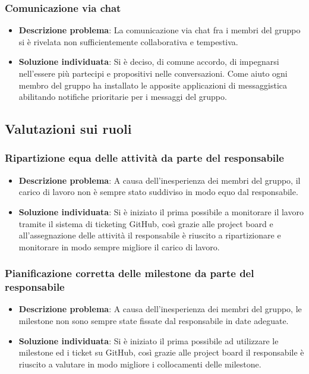 		\subsubsection{Comunicazione via chat}
			\begin{itemize}
			\item \textbf{Descrizione problema}: La comunicazione via chat fra i membri del gruppo si è rivelata non sufficientemente collaborativa e tempestiva.
			\item \textbf{Soluzione individuata}: Si è deciso, di comune accordo, di impegnarsi nell'essere più partecipi e propositivi nelle conversazioni. Come aiuto ogni membro del gruppo ha installato le apposite applicazioni di messaggistica abilitando notifiche prioritarie per i messaggi del gruppo.
			\end{itemize}
\subsection{Valutazioni sui ruoli}
	\subsubsection{Ripartizione equa delle attività da parte del responsabile}
	\begin{itemize}
		\item \textbf{Descrizione problema}: A causa dell'inesperienza dei membri del gruppo, il carico di lavoro non è sempre stato suddiviso in modo equo dal responsabile.
		\item \textbf{Soluzione individuata}: Si è iniziato il prima possibile a monitorare il lavoro tramite il sistema di ticketing GitHub, così grazie alle project board e all'assegnazione delle attività il responsabile è riuscito a ripartizionare e monitorare in modo sempre migliore il carico di lavoro.
	\end{itemize}
	\subsubsection{Pianificazione corretta delle milestone da parte del responsabile}
	\begin{itemize}
	\item \textbf{Descrizione problema}: A causa dell'inesperienza dei membri del gruppo, le milestone non sono sempre state fissate dal responsabile in date adeguate.
	\item \textbf{Soluzione individuata}: Si è iniziato il prima possibile ad utilizzare le milestone ed i ticket su GitHub, così grazie alle project board il responsabile è riuscito a valutare in modo migliore i collocamenti delle milestone.
	\end{itemize}
